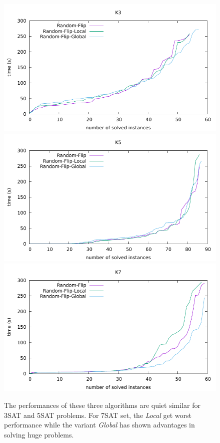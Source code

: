 \documentclass[12pt,a4paper,twoside]{scrartcl}
\numberwithin{equation}{section}
\begin{document}
  \begin{figure}[H]
\begin{center}
  \includegraphics[scale = 0.8]{DATA/K3/e3r.pdf}
  \includegraphics[scale = 0.8]{DATA/K5/e3r.pdf}
    \includegraphics[scale = 0.8]{DATA/K7/e3r.pdf}
    \caption{
The performances of these three algorithms are quiet similar for 3SAT and 5SAT problems.  For 7SAT set, the \emph{Local} get worst performance while the variant \emph{Global} has shown  advantages in solving huge problems.}
  \end{center}
  \end{figure}
  \clearpage  
  
\end{document}
